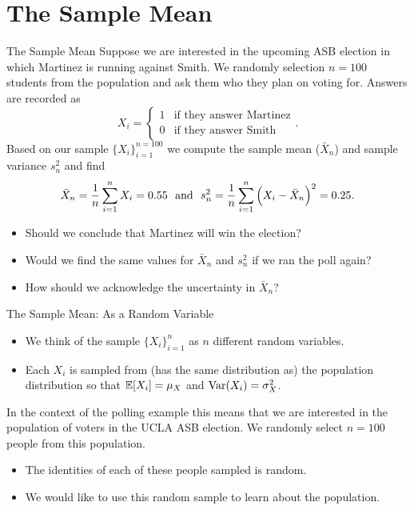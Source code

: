 \documentclass[notheorems,9pt]{beamer}
\begin{document}
\section{The Sample Mean}
\begin{frame}{The Sample Mean} 
	\label{frame:sm-intro}
	 Suppose we are interested in the upcoming ASB election in which Martinez is running against Smith. We randomly selection \(n=100\) students from the population and ask them who they plan on voting for. Answers are recorded as 
	\[
	    X_i = \begin{cases}
	    	1 & \text{if they answer Martinez} \\
			0 & \text{if they answer Smith}
	    \end{cases}
	.\] 
	Based on our sample \(\{X_i\}_{i=1}^{n=100}\) we compute the sample mean (\(\bar X_n\)) and sample variance \(s_n^2\) and find 
	\[
	    \bar X_n = \frac{1}{n}\sum_{i=1}^n X_i = 0.55 \hbox{ }\text{ and }\hbox{ } s_n^2 = \frac{1}{n}\sum_{i=1}^n \left(X_i-\bar X_n\right)^2 = 0.25
	.\] 
	\onslide<2->
	\begin{itemize}
		\item<2-> Should we conclude that Martinez will win the election?
		\item<3-> Would we find the same values for \(\bar X_n\) and \(s_n^2\) if we ran the poll again?
		\item<4-> How should we acknowledge the uncertainty in \(\bar X_n\)?
	\end{itemize}
\end{frame}
\begin{frame}{The Sample Mean: As a Random Variable} 
	\begin{center}
	\end{center}
	\begin{itemize}
		\item We think of the sample \(\{X_i\}_{i=1}^n\) as \(n\) different random variables.
		\item Each \(X_i\) is sampled from (has the same distribution as) the population distribution so that \(\mathbb{E}[X_i]=\mu_X\) and \(\operatorname{Var}(X_i)=\sigma_X^2\).
	\end{itemize}
	In the context of the polling example this means that we are interested in the population of voters in the UCLA ASB election. We randomly select \(n=100\) people from this population.
	\begin{itemize}
		\item The identities of each of these people sampled is random.
		\item We would like to use this random sample to learn about the population.
	\end{itemize}
\end{frame}
\end{document}
